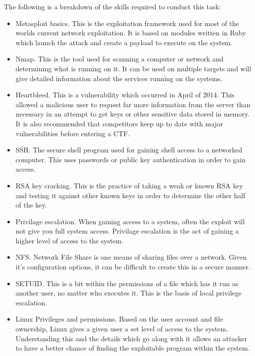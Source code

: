\documentclass[a4paper,11pt]{report}
\begin{document}
			The following is a breakdown of the skills required to conduct this task:
			\begin{itemize}
				\item Metasploit basics. 
					This is the exploitation framework used for most of the worlds current network exploitation. 
					It is based on modules written in Ruby which launch the attack and create a payload to execute on the system. 
				\item Nmap.
					This is the tool used for scanning a computer or network and determining what is running on it. 
					It can be used on multiple targets and will give detailed information about the services running on the systems. 
				\item Heartbleed.
					This is a vulnerability which occurred in April of 2014. 
					This allowed a malicious user to request far more information from the server than necessary in an attempt to get keys or other sensitive data stored in memory. 
					It is also recommended that competitors keep up to date with major vulnerabilities before entering a CTF.
				\item SSH.
					The secure shell program used for gaining shell access to a networked computer. 
					This uses passwords or public key authentication in order to gain access. 
				\item RSA key cracking. 
					This is the practice of taking a weak or known RSA key and testing it against other known keys in order to determine the other half of the key. 
				\item Privilage escalation. 
					When gaining access to a system, often the exploit will not give you full system access. 
					Privilage escalation is the act of gaining a higher level of access to the system. 
				\item NFS.
					Network File Share is one means of sharing files over a network. 
					Given it's configuration options, it can be difficult to create this in a secure manner. 
				\item SETUID. 
					This is a bit within the permissions of a file which has it run as another user, no matter who executes it. 
					This is the basis of local privilege escalation. 
				\item Linux Privileges and permissions. 
					Based on the user account and file ownership, Linux gives a given user a set level of access to the system. 
					Understanding this and the details which go along with it allows an attacker to have a better chance of finding the exploitable program within the system. 
			\end{itemize}
\end{document}
